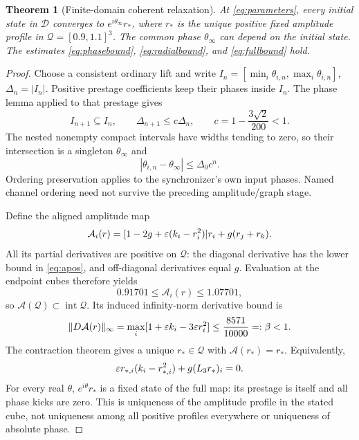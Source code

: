 \documentclass[11pt,a4paper]{article}
\numberwithin{equation}{section}
\newtheorem{theorem}{Theorem}[section]
\theoremstyle{remark}\newtheorem{remark}[theorem]{Remark}
\begin{document}
\begin{theorem}[Finite-domain coherent relaxation]\label{thm:convergence}
At \eqref{eq:parameters}, every initial state in $\mathcal D$ converges to $e^{i\theta_\infty}r_*$, where $r_*$ is the unique positive fixed amplitude profile in $\mathcal Q=[0.9,1.1]^3$. The common phase $\theta_\infty$ can depend on the initial state. The estimates \eqref{eq:phasebound}, \eqref{eq:radialbound}, and \eqref{eq:fullbound} hold.
\end{theorem}
\begin{proof}
Choose a consistent ordinary lift and write $I_n=[\min_i\theta_{i,n},\max_i\theta_{i,n}]$, $\Delta_n=|I_n|$. Positive prestage coefficients keep their phases inside $I_n$. The phase lemma applied to that prestage gives
\begin{equation}
I_{n+1}\subseteq I_n,\qquad\Delta_{n+1}\le c\Delta_n,
\qquad c=1-\frac{3\sqrt2}{200}<1.\label{eq:nesting}
\end{equation}
The nested nonempty compact intervals have widths tending to zero, so their intersection is a singleton $\theta_\infty$ and
\begin{equation}
|\theta_{i,n}-\theta_\infty|\le\Delta_0c^n.\label{eq:phasebound}
\end{equation}
Ordering preservation applies to the synchronizer's own input phases. Named channel ordering need not survive the preceding amplitude/graph stage.

Define the aligned amplitude map
\begin{equation}
\mathcal A_i(r)=[1-2g+\varepsilon(k_i-r_i^2)]r_i+g(r_j+r_k).
\label{eq:amplitudemap}
\end{equation}
All its partial derivatives are positive on $\mathcal Q$: the diagonal derivative has the lower bound in \eqref{eq:apos}, and off-diagonal derivatives equal $g$. Evaluation at the endpoint cubes therefore yields
\begin{equation}
0.91701\le\mathcal A_i(r)\le1.07701,
\end{equation}
so $\mathcal A(\mathcal Q)\subset\operatorname{int}\mathcal Q$. Its induced infinity-norm derivative bound is
\begin{equation}
\|D\mathcal A(r)\|_\infty
=\max_i[1+\varepsilon k_i-3\varepsilon r_i^2]
\le\frac{8571}{10000}=:\beta<1.\label{eq:beta}
\end{equation}
The contraction theorem gives a unique $r_*\in\mathcal Q$ with $\mathcal A(r_*)=r_*$. Equivalently,
\begin{equation}
\varepsilon r_{*,i}(k_i-r_{*,i}^2)+g(L_3r_*)_i=0.\label{eq:fixed}
\end{equation}
For every real $\theta$, $e^{i\theta}r_*$ is a fixed state of the full map: its prestage is itself and all phase kicks are zero. This is uniqueness of the amplitude profile in the stated cube, not uniqueness among all positive profiles everywhere or uniqueness of absolute phase.


\end{proof}
\end{document}
